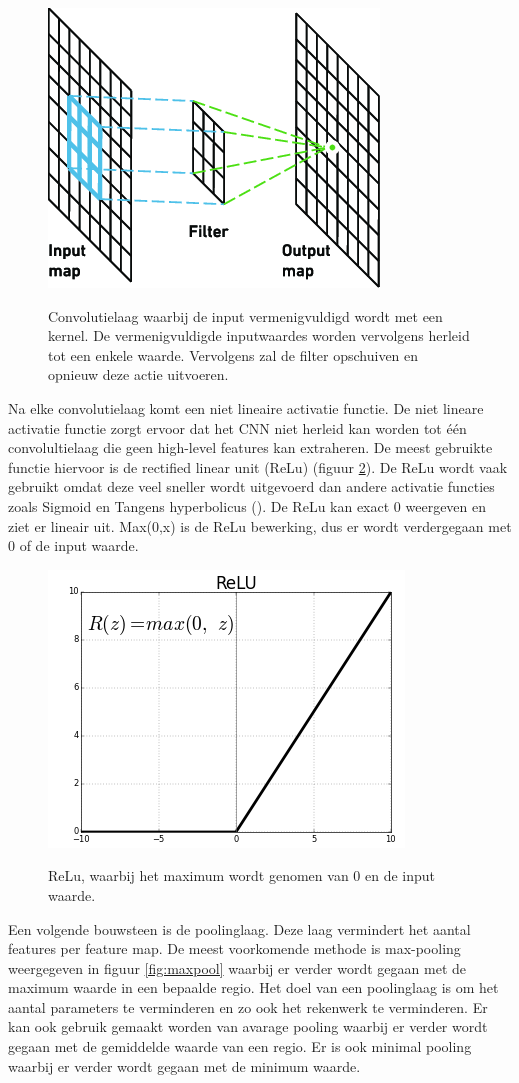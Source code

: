 \begin{figure}[!ht]
	\centering
	\includegraphics[width=0.35\linewidth]{fig/convolution layer.png}
	\caption{Convolutielaag waarbij de input vermenigvuldigd wordt met een kernel. De vermenigvuldigde inputwaardes worden vervolgens herleid tot een enkele waarde. Vervolgens zal de filter opschuiven en opnieuw deze actie uitvoeren.}
	\label{fig:conv_laag}
	\cite{brownlee_convolutional_2017}
\end{figure}

Na elke convolutielaag komt een niet lineaire activatie functie.
De niet lineare activatie functie zorgt ervoor dat het CNN niet herleid kan worden tot \'e\'en convolultielaag die geen high-level features kan extraheren. 
De meest gebruikte functie hiervoor is de rectified linear unit (ReLu) (figuur \ref{fig:relu}). 
De ReLu wordt vaak gebruikt omdat deze veel sneller wordt uitgevoerd dan andere activatie functies zoals Sigmoid en Tangens hyperbolicus (\cite{Krizhevsky_act_2017}).
De ReLu kan exact 0 weergeven en ziet er lineair uit. 
Max(0,x) is de ReLu bewerking, dus er wordt verdergegaan met 0 of de input waarde. 

\begin{figure}[!ht]
 	\centering
 	\includegraphics[width=0.35\linewidth]{fig/ReLu.png}
 	\caption{ReLu, waarbij het maximum wordt genomen van 0 en de input waarde.}
 	\label{fig:relu}
	\cite{Kanchan_activation_2018}
\end{figure}

Een volgende bouwsteen is de poolinglaag.
Deze laag vermindert het aantal features per feature map. 
De meest voorkomende methode is max-pooling weergegeven in figuur \ref{fig:maxpool} waarbij er verder wordt gegaan met de maximum waarde in een bepaalde regio. 
Het doel van een poolinglaag is om het aantal parameters te verminderen en zo ook het rekenwerk te verminderen. 
Er kan ook gebruik gemaakt worden van avarage pooling waarbij er verder wordt gegaan met de gemiddelde waarde van een regio. 
Er is ook minimal pooling waarbij er verder wordt gegaan met de minimum waarde.

